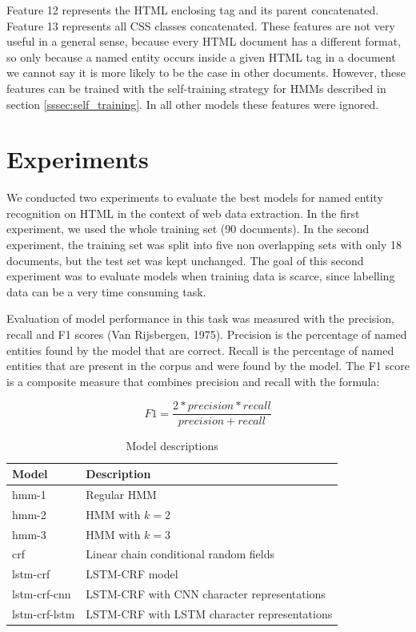 \documentclass[sigconf]{acmart}
\begin{document}
Feature 12 represents the HTML enclosing tag and its parent concatenated. Feature 13
represents all CSS classes concatenated. These features are not very useful in a general
sense, because every HTML document has a different format, so only because a named entity
occurs inside a given HTML tag in a document we cannot say it is more likely to be the case 
in other documents. However, these features can be trained with the self-training strategy 
for HMMs described in section \ref{sssec:self_training}. In all other models these features 
were ignored.

\section{Experiments}

We conducted two experiments to evaluate the best models for named entity recognition
on HTML in the context of web data extraction. In the first experiment, we used the
whole training set (90 documents). In the second experiment, the training set was split 
into five non overlapping sets with only 18 documents, but the test set was kept unchanged. 
The goal of this second experiment 
was to evaluate models when training data is scarce, since labelling data can be a very 
time consuming task.

Evaluation of model performance in this task was measured with the precision, recall and 
F1 scores (Van Rijsbergen, 1975). Precision is the percentage of named entities found by 
the model that are correct. Recall is the percentage of named entities that are present
in the corpus and were found by the model. The F1 score is a composite measure that combines
precision and recall with the formula:

\begin{equation}
F1 = \frac{2 * precision * recall}{precision + recall}
\end{equation}

\begin{table}[h]
  \small
  \begin{center}
    \begin{tabular}{ ll }
      \toprule
      Model & Description \\
      \midrule
      hmm-1         & Regular HMM \\
      hmm-2         & HMM with $ k=2 $ \\
      hmm-3         & HMM with $ k=3 $ \\
      crf           & Linear chain conditional random fields \\
      lstm-crf      & LSTM-CRF model \cite{Huang2015} \\
      lstm-crf-cnn  & LSTM-CRF with CNN character representations \cite{Ma2016} \\
      lstm-crf-lstm & LSTM-CRF with LSTM character representations \cite{Lample2016} \\
      \bottomrule
    \end{tabular}
  \end{center}
  \caption{Model descriptions}
  \label{tab:models}
\end{table}
\end{document}
